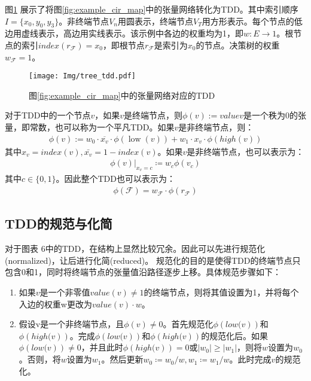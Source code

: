 图\ref{fig:tdd_ex} 展示了将图\ref{fig:example_cir_map}中的张量网络转化为TDD。其中索引顺序$I=\{x_0,y_0,y_3\}$。非终端节点$V_n$用圆表示，终端节点$V_T$用方形表示。每个节点的低边用虚线表示，高边用实线表示。该示例中各边的权重均为1，即$w:E\rightarrow 1$。根节点的索引$index(r_{\mathcal{F}})=x_0$，即根节点\(r_{\mathcal{F}}\)是索引为\(x_0\)的节点。决策树的权重$w_{\mathcal{F}}=1$。
\begin{figure}[!htbp]
    \centering
    \texttt{[image: Img/tree\_tdd.pdf]}
    \caption{图\ref{fig:example_cir_map}中的张量网络对应的TDD}   
    \label{fig:tdd_ex}
\end{figure}

对于TDD中的一个节点$v$，如果$v$是终端节点，则$\phi\left(v\right):= valuev$是一个秩为$0$的张量，即常数，也可以称为一个平凡TDD。如果$v$是非终端节点，则：
\begin{align}
    \phi(v):=w_{0} \cdot \overline{x_{v}} \cdot \phi(\operatorname{low}(v))+w_{1} \cdot x_{v} \cdot \phi(h i g h(v))
\end{align}
其中$x_v=index\left(v\right),\bar{x_v}=1-index\left(v\right)$。如果$v$是非终端节点，也可以表示为：
\begin{align}
    \left.\phi\left(v\right)\right|_{x_v=c}≔w_c \phi (v_c)
\end{align}
其中$c\in\{0,1\}$。因此整个TDD也可以表示为：
\begin{align}
    \phi\left(\mathcal{F}\right)=w_{\mathcal{F}}\cdot\phi\left(r_{\mathcal{F}}\right)
\end{align}
\subsection{TDD的规范与化简}
对于图表 6中的TDD，在结构上显然比较冗余。因此可以先进行规范化(normalized)，让后进行化简(reduced)\citep{Hong_2022}。
规范化的目的是使得TDD的终端节点只包含0和1，同时将终端节点的张量值沿路径逐步上移。具体规范步骤如下：
\begin{enumerate}
    \item 如果$v$是一个非零值$value\left(v\right)\neq 1$的终端节点，则将其值设置为1，并将每个入边的权重w更改为$value\left(v\right)\cdot w$。\label{norm1}
    \item 假设v是一个非终端节点，且$\phi\left(v\right)\neq 0$。首先规范化$\phi\left.\left(low(v\right)\right)$和$\phi\left.\left(high(v\right)\right)$。完成$\phi\left.\left(low(v\right)\right)$和$\phi\left.\left(high(v\right)\right)$的规范化后。如果$\phi\left.\left(low(v\right)\right)\neq 0$，并且此时$\phi\left.\left(high(v\right)\right)=0$或$\left|w_0\right|\geq\left|w_1\right|$，则将$w$设置为$w_0$。否则，将$w$设置为$w_1$。然后更新$w_0≔w_0/w,w_1≔w_1/w$。此时完成$v$的规范化。\label{norm2}
\end{enumerate}

